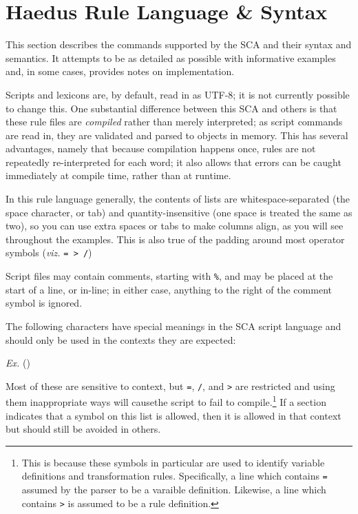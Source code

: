 \documentclass[10pt,letterpaper]{article}
\newcounter{excounter}
\newenvironment{vex}[1]{
	\refstepcounter{excounter}
	\noindent\emph{Ex.} (\arabic{excounter}\label{#1})
	\verbatim
}{\endverbatim}
\begin{document}

\section{Haedus Rule Language \& Syntax}
\label{prt:scripts_and_syntax}
This section describes the commands supported by the SCA and their syntax and semantics. It attempts to be as detailed as possible with informative examples and, in some cases, provides notes on implementation.

Scripts and lexicons are, by default, read in as UTF-8; it is not currently possible to change this. One substantial difference between this SCA and others is that these rule files are \emph{compiled} rather than merely interpreted; as script commands are read in, they are validated and parsed to objects in memory. This has several advantages, namely that because compilation happens once, rules are not repeatedly re-interpreted for each word; it also allows that errors can be caught immediately at compile time, rather than at runtime.

In this rule language generally, the contents of lists are whitespace-separated (the space character, or tab) and quantity-insensitive (one space is treated the same as two), so you can use extra spaces or tabs to make columns align, as you will see throughout the examples. This is also true of the padding around most operator symbols (\emph{viz.} \texttt{= > /})


Script files may contain comments, starting with \texttt{\%}, and may be placed at the start of a line, or in-line; in either case, anything to the right of the comment symbol is ignored.

The following characters have special meanings in the SCA script language and should only be used in the contexts they are expected:

\begin{vex}{ex:reserved}
\end{vex}
\noindent
Most of these are sensitive to context, but \texttt{=}, \texttt{/}, and \texttt{>} are restricted and using them inappropriate ways will causethe script to  fail to compile.\footnote{This is because these symbols in particular are used to identify variable definitions and transformation rules. Specifically, a line which contains \texttt{=} assumed by the parser to be a varaible definition. Likewise, a line which contains \texttt{>} is assumed to be a rule definition.} If a section indicates that a symbol on this list is allowed, then it is allowed in that context but should still be avoided in others.
\end{document}
